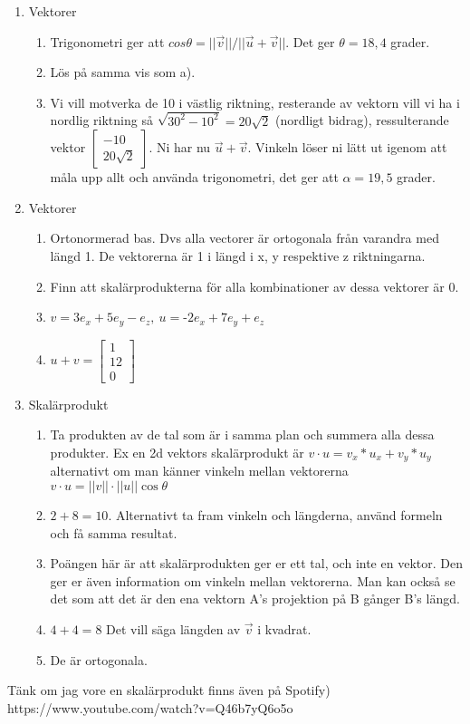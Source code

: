 \documentclass[a4paper]{article}
\begin{document}
\begin{enumerate}
\item Vektorer
\begin{enumerate}
\item Trigonometri ger att $cos \theta = || \vec{v} || / || \vec{u} + \vec{v} || $. Det ger $\theta = 18,4$ grader. 
\item Lös på samma vis som a). 
\item Vi vill motverka de 10 i västlig riktning, resterande av vektorn vill vi ha i nordlig riktning så $\sqrt{30^{2}-10^{2}} = 20\sqrt{2}$ (nordligt bidrag), ressulterande vektor $\begin{bmatrix} -10 \\ 20\sqrt{2} \end{bmatrix}$. Ni har nu $\vec{u} + \vec{v}$. Vinkeln löser ni lätt ut igenom att måla upp allt och använda trigonometri, det ger att $\alpha = 19,5$ grader. 
\end{enumerate}

\item Vektorer
\begin{enumerate}
\item Ortonormerad bas. Dvs alla vectorer är ortogonala från varandra med längd 1. De vektorerna är 1 i längd i x, y respektive z riktningarna.
\item Finn att skalärprodukterna för alla kombinationer av dessa vektorer är 0.
\item $v=3e_{x}+5e_{y}-e_{z},\ u=\text{-}2e_{x}+7e_{y}+e_{z}$
\item $u+v=\begin{bmatrix}1 \\ 12\\ 0\end{bmatrix}$
\end{enumerate}

\item Skalärprodukt
\begin{enumerate}
\item Ta produkten av de tal som är i samma plan och summera alla dessa produkter. Ex en 2d vektors skalärprodukt är $v \cdot u = v_{x}*u_{x}+v_{y}*u_{y} $ alternativt om man känner vinkeln mellan vektorerna $v \cdot u = ||v||\cdot||u||\cos\theta$
\item $2+8=10$. Alternativt ta fram vinkeln och längderna, använd formeln och få samma resultat. 
\item Poängen här är att skalärprodukten ger er ett tal, och inte en vektor. Den ger er även information om vinkeln mellan vektorerna. Man kan också se det som att det är den ena vektorn A's projektion på B gånger B's längd. 
\item $4+4=8$ Det vill säga längden av $\vec{v}$ i kvadrat.
\item De är ortogonala.
\end{enumerate}
\end{enumerate} 

Tänk om jag vore en skalärprodukt finns även på Spotify)\\
https://www.youtube.com/watch?v=Q46b7yQ6o5o
\end{document}
